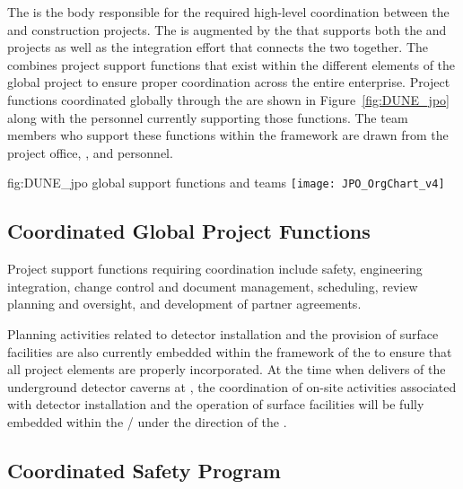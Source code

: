 The  is the body responsible for the required high-level
coordination between the  and  construction 
projects. 
The  is augmented by the  that supports both 
the  and  projects as well as the integration
effort that connects the two together. The  combines
project support functions that exist within the different elements 
of the global project to ensure proper coordination across the entire 
 enterprise.  Project functions coordinated globally 
through the  are shown in Figure~\ref{fig:DUNE_jpo} along 
with the personnel currently supporting those functions.  The team 
members who support these functions within the  framework
are drawn from the  project office,  , 
and   personnel.  
\begin{dunefigure}{fig:DUNE_jpo}
  { global support functions and teams}
  \texttt{[image: JPO\_OrgChart\_v4]}
\end{dunefigure}


\subsection{Coordinated Global Project Functions}

Project support functions requiring  coordination include
safety, engineering integration, change control and document 
management, scheduling, review planning and oversight, and development 
of partner agreements.  

Planning activities related to detector installation and the provision 
of surface facilities are also currently embedded within the framework 
of the  to ensure that all project elements are properly 
incorporated.  At the time when   delivers 
 of the underground detector caverns at , the 
coordination of on-site activities associated with detector installation 
and the operation of surface facilities will be fully embedded within 
the /  under the direction of the .  


\subsection{Coordinated Safety Program}    
\label{sec:dune_safety}


